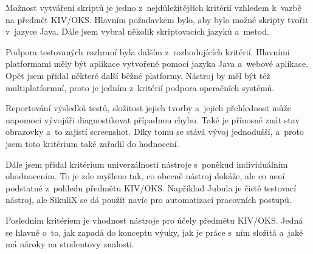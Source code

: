 \documentclass{bakalarka}
\begin{document}
Možnost vytváření skriptů je jedno z~nejdůležitějších kritérií vzhledem k~vazbě na předmět KIV/OKS. Hlavním požadavkem bylo, aby bylo možné skripty tvořit v~jazyce Java. Dále jsem vybral několik skriptovacích jazyků a~metod.

Podpora testovaných rozhraní byla dalším z~rozhodujících kritérií. Hlavními platformami měly být aplikace vytvořené pomocí jazyka Java a~webové aplikace. Opět jsem přidal některé další běžné platformy. Nástroj by měl být též multiplatformní, proto je jedním z~kritérií podpora operačních systémů.

Reportování výsledků testů, složitost jejich tvorby a~jejich přehlednost může napomoci vývojáři diagnostikovat případnou chybu. Také je přínosné znát stav obrazovky a~to zajistí screenshot. Díky tomu se stává vývoj jednodušší, a~proto jsem toto kritérium také zařadil do hodnocení.

Dále jsem přidal kritérium univerzálnosti nástroje s~poněkud individuálním ohodnocením. To je zde myšleno tak, co obecně nástroj dokáže, ale co není podstatné z~pohledu předmětu KIV/OKS. Například Jubula je čistě testovací nástroj, ale SikuliX se dá použít navíc pro automatizaci pracovních postupů.

Posledním kritériem je vhodnost nástroje pro účely předmětu KIV/OKS. Jedná se hlavně o~to, jak zapadá do konceptu výuky, jak je práce s~ním složitá a~jaké má nároky na studentovy znalosti.
\end{document}
